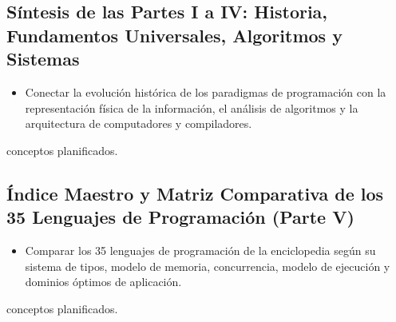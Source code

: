 \documentclass{book}
\begin{document}
\subsection*{\checkmark Síntesis de las Partes I a IV: Historia, Fundamentos Universales, Algoritmos y Sistemas}
\begin{itemize}
\item Conectar la evolución histórica de los paradigmas de programación con la representación física de la información, el análisis de algoritmos y la arquitectura de computadores y compiladores.
\end{itemize}
 conceptos planificados.

\subsection*{\checkmark Índice Maestro y Matriz Comparativa de los 35 Lenguajes de Programación (Parte V)}
\begin{itemize}
\item Comparar los 35 lenguajes de programación de la enciclopedia según su sistema de tipos, modelo de memoria, concurrencia, modelo de ejecución y dominios óptimos de aplicación.
\end{itemize}
 conceptos planificados.
\end{document}
